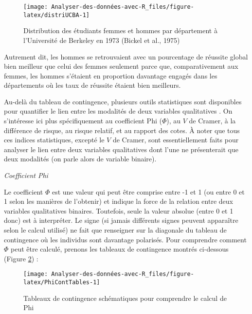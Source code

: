 \documentclass[
]{book}
\begin{document}
\begin{figure}

{\centering \texttt{[image: Analyser-des-données-avec-R\_files/figure-latex/distriUCBA-1]} 

}

\caption{Distribution des étudiants femmes et hommes par département à l'Université de Berkeley en 1973 (Bickel et al., 1975)}\label{fig:distriUCBA}
\end{figure}

Autrement dit, les hommes se retrouvaient avec un pourcentage de réussite global bien meilleur que celui des femmes seulement parce que, comparativement aux femmes, les hommes s'étaient en proportion davantage engagés dans les départements où les taux de réussite étaient bien meilleurs.

Au-delà du tableau de contingence, plusieurs outils statistiques sont disponibles pour quantifier le lien entre les modalités de deux variables qualitatives \autocite{janeEffectSizesConfidence2023}. On s'intéresse ici plus spécifiquement au coefficient Phi (\(\Phi\)), au \(V\) de Cramer, à la différence de risque, au risque relatif, et au rapport des cotes. À noter que tous ces indices statistiques, excepté le \(V\) de Cramer, sont essentiellement faits pour analyser le lien entre deux variables qualitatives dont l'une ne présenterait que deux modalités (on parle alors de variable binaire).

\emph{Coefficient Phi}

Le coefficient \(\Phi\) est une valeur qui peut être comprise entre -1 et 1 (ou entre 0 et 1 selon les manières de l'obtenir) et indique la force de la relation entre deux variables qualitatives binaires. Toutefois, seule la valeur absolue (entre 0 et 1 donc) est à interpréter. Le signe (si jamais différents signes peuvent apparaître selon le calcul utilisé) ne fait que renseigner sur la diagonale du tableau de contingence où les individus sont davantage polarisés. Pour comprendre comment \(\Phi\) peut être calculé, prenons les tableaux de contingence montrés ci-dessous (Figure \ref{fig:PhiContTables}) :

\begin{figure}

{\centering \texttt{[image: Analyser-des-données-avec-R\_files/figure-latex/PhiContTables-1]} 

}

\caption{Tableaux de contingence schématiques pour comprendre le calcul de Phi}\label{fig:PhiContTables}
\end{figure}
\end{document}

